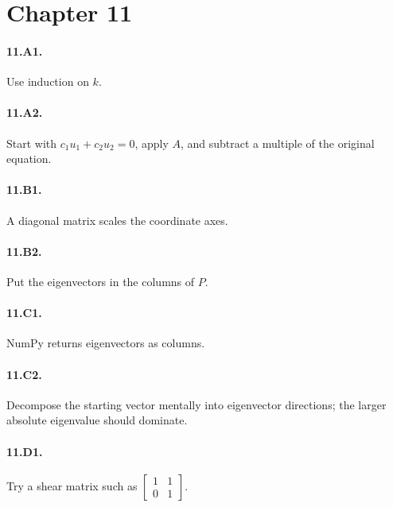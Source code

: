 \section*{Chapter 11}
\paragraph{11.A1.} Use induction on $k$.
\paragraph{11.A2.} Start with $c_1u_1+c_2u_2=0$, apply $A$, and subtract a
multiple of the original equation.
\paragraph{11.B1.} A diagonal matrix scales the coordinate axes.
\paragraph{11.B2.} Put the eigenvectors in the columns of $P$.
\paragraph{11.C1.} NumPy returns eigenvectors as columns.
\paragraph{11.C2.} Decompose the starting vector mentally into eigenvector
directions; the larger absolute eigenvalue should dominate.
\paragraph{11.D1.} Try a shear matrix such as
$\begin{bmatrix}1&1\\0&1\end{bmatrix}$.
